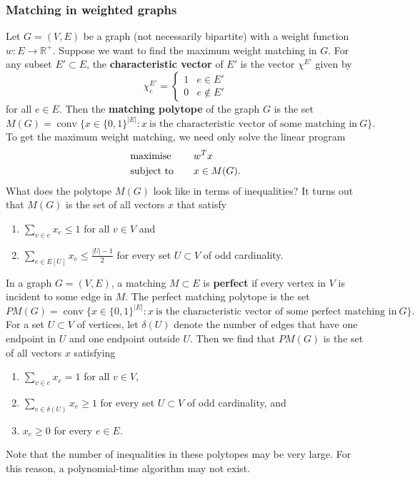 \documentclass[12pt]{article}
\newcommand{\R}{\mathbb{R}}
\DeclareMathOperator{\conv}{conv}
\theoremstyle{plain}
\begin{document}
\subsubsection{Matching in weighted graphs}
Let $G=(V,E)$ be a graph (not necessarily bipartite) with a weight function $w:E\rightarrow \R^+$. Suppose we want to find the maximum weight matching in $G$. For any subset $E'\subset E$, the \textbf{characteristic vector} of $E'$ is the vector $\chi^{E'}$ given by
$$ \chi_e^{E'} = \begin{cases} 1 & e\in E' \\ 0 & e\notin E'\end{cases} $$
for all $e\in E$. Then the \textbf{matching polytope} of the graph $G$ is the set
$$ M(G) = \conv\{ x \in \{0,1\}^{|E|} : x\ \text{is the characteristic vector of some matching in}\ G\}.$$
To get the maximum weight matching, we need only solve the linear program
\begin{alignat*}{2}
    & \textup{maximise} & \quad & w^Tx \\
    & \textup{subject to} & & x\in M(G).
\end{alignat*}
What does the polytope $M(G)$ look like in terms of inequalities? It turns out that $M(G)$ is the set of all vectors $x$ that satisfy
\begin{enumerate}
    \item $\displaystyle\sum_{v\in e}x_e \leq 1$ for all $v\in V$ and
    \item $\displaystyle\sum_{e\in E[U]}x_e \leq \frac{|U|-1}{2}$ for every set $U\subset V$ of odd cardinality.
\end{enumerate}
In a graph $G=(V,E)$, a matching $M\subset E$ is \textbf{perfect} if every vertex in $V$ is incident to some edge in $M$. The perfect matching polytope is the set
$$ PM(G) = \conv\{ x \in \{0,1\}^{|E|} : x\ \text{is the characteristic vector of some perfect matching in}\ G\}.$$
For a set $U\subset V$ of vertices, let $\delta(U)$ denote the number of edges that have one endpoint in $U$ and one endpoint outside $U$. Then we find that $PM(G)$ is the set of all vectors $x$ satisfying
\begin{enumerate}
    \item $\displaystyle\sum_{v\in e}x_e = 1$ for all $v\in V$,
    \item $\displaystyle\sum_{e\in \delta(U)}x_e\geq 1$ for every set $U\subset V$ of odd cardinality, and
    \item $x_e \geq 0$ for every $e\in E$.
\end{enumerate}
Note that the number of inequalities in these polytopes may be very large. For this reason, a polynomial-time algorithm may not exist.
\end{document}
